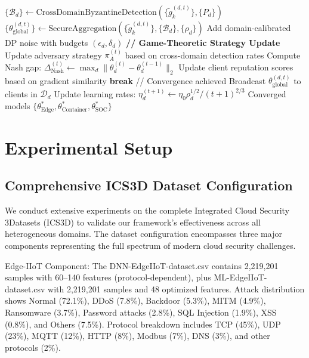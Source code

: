 \documentclass[12pt,a4paper]{article}
\theoremstyle{definition}
\newcommand{\D}{\mathcal{D}}
\newcommand{\B}{\mathcal{B}}
\begin{document}
\begin{algorithm}[!t]
\begin{algorithmic}[1]
    \State $\{\B_d\} \leftarrow \text{CrossDomainByzantineDetection}(\{\tilde{g}_k^{(d,t)}\}, \{P_d\})$ 
    \State $\{\theta_{\text{global}}^{(d,t)}\} \leftarrow \text{SecureAggregation}(\{\tilde{g}_k^{(d,t)}\}, \{\B_d\}, \{\rho_d\})$
    \State Add domain-calibrated DP noise with budgets $(\epsilon_d, \delta_d)$
    \State \textbf{// Game-Theoretic Strategy Update}
    \State Update adversary strategy $\pi_A^{(t)}$ based on cross-domain detection rates
    \State Compute Nash gap: $\Delta_{\text{Nash}}^{(t)} \leftarrow \max_d \|\theta_d^{(t)} - \theta_d^{(t-1)}\|_2$
    \State Update client reputation scores based on gradient similarity
        \State \textbf{break} // Convergence achieved
    \EndIf
        \State Broadcast $\theta_{\text{global}}^{(d,t)}$ to clients in $\D_d$
        \State Update learning rates: $\eta_d^{(t+1)} \leftarrow \eta_0 \rho_d^{1/2} / (t+1)^{2/3}$
    \EndFor
\EndFor
\State \Return Converged models $\{\theta_{\text{Edge}}^*, \theta_{\text{Container}}^*, \theta_{\text{SOC}}^*\}$
\end{algorithmic}
\end{algorithm}

\section{Experimental Setup}

\subsection{Comprehensive ICS3D Dataset Configuration}

We conduct extensive experiments on the complete Integrated Cloud Security 3Datasets (ICS3D) to validate our framework's effectiveness across all heterogeneous domains. The dataset configuration encompasses three major components representing the full spectrum of modern cloud security challenges.

Edge-IIoT Component: The DNN-EdgeIIoT-dataset.csv contains 2,219,201 samples with 60--140 features (protocol-dependent), plus ML-EdgeIIoT-dataset.csv with 2,219,201 samples and 48 optimized features. Attack distribution shows Normal (72.1\%), DDoS (7.8\%), Backdoor (5.3\%), MITM (4.9\%), Ransomware (3.7\%), Password attacks (2.8\%), SQL Injection (1.9\%), XSS (0.8\%), and Others (7.5\%). Protocol breakdown includes TCP (45\%), UDP (23\%), MQTT (12\%), HTTP (8\%), Modbus (7\%), DNS (3\%), and other protocols (2\%).
\end{document}
